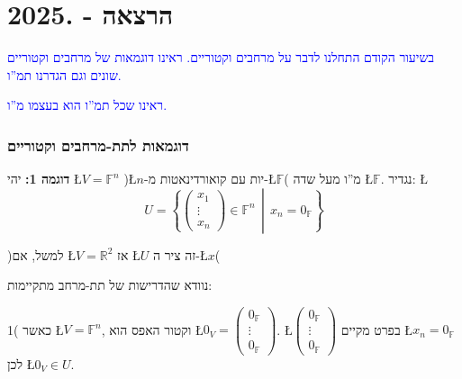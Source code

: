 \documentclass[english,hebrew]{article}
\begin{document}
\newpage{}

\noindent{}

\part{הרצאה {\endL} - {.2025\endL}}

\textcolor{blue}{בשיעור הקודם התחלנו לדבר על מרחבים וקטוריים. ראינו
דוגמאות של מרחבים וקטוריים שונים וגם הגדרנו תמ\textquotedblright ו.}

\textcolor{blue}{ראינו שכל תמ\textquotedblright ו הוא בעצמו מ\textquotedblright ו. }

\section{דוגמאות לתת-מרחבים וקטוריים}

\textbf{דוגמה 1:} יהי \L{$V=\mathbb{F}^{n}$} )\L{$n$}-יות עם קואורדינאטות
מ-\L{$\mathbb{F}$}( מ\textquotedblright ו מעל שדה \L{$\mathbb{F}$}.
נגדיר: \L{%
\[
U=\left\{ \begin{pmatrix}x_{1}\\
\vdots\\
x_{n}
\end{pmatrix}\in\mathbb{F}^{n}\,\middle|\,x_{n}=0_{\mathbb{F}}\right\} 
\]
}%

)למשל, אם \L{$V=\mathbb{R}^{2}$} אז \L{$U$} זה ציר ה-\L{$x$}(

נוודא שהדרישות של תת-מרחב מתקיימות:

1( כאשר \L{$V=\mathbb{F}^{n}$}, וקטור האפס הוא \L{$0_{V}=\begin{pmatrix}0_{\mathbb{F}}\\
\vdots\\
0_{\mathbb{F}}
\end{pmatrix}$}. \L{$\begin{pmatrix}0_{\mathbb{F}}\\
\vdots\\
0_{\mathbb{F}}
\end{pmatrix}$} בפרט מקיים \L{$x_{n}=0_{\mathbb{F}}$} לכן \L{$0_{V}\in U$}.
\end{document}
